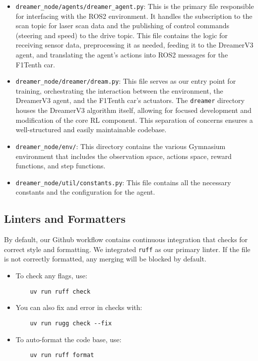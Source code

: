 \begin{itemize}
    \item \texttt{dreamer\_node/agents/dreamer\_agent.py}: This is the primary file responsible for interfacing with the ROS2 environment.  It handles the subscription to the scan topic for laser scan data and the publishing of control commands (steering and speed) to the drive topic.  This file contains the logic for receiving sensor data, preprocessing it as needed, feeding it to the DreamerV3 agent, and translating the agent's actions into ROS2 messages for the F1Tenth car.
    \item \texttt{dreamer\_node/dreamer/dream.py}: This file serves as our entry point for training, orchestrating the interaction between the environment, the DreamerV3 agent, and the F1Tenth car's actuators.  The \texttt{dreamer} directory houses the DreamerV3 algorithm itself, allowing for focused development and modification of the core RL component.  This separation of concerns ensures a well-structured and easily maintainable codebase.
    \item \texttt{dreamer\_node/env/}: This directory contains the various Gymnasium environment that includes the observation space, actions space, reward functions, and step functions.
    \item \texttt{dreamer\_node/util/constants.py}: This file contains all the necessary constants and the configuration for the agent.
    
\end{itemize}

\subsection{Linters and Formatters}
By default, our Github workflow contains continuous integration that checks for correct style and formatting. We integrated \texttt{ruff} as our primary linter. If the file is not correctly formatted, any merging will be blocked by default.

\begin{itemize}
    \item To check any flags, use:
    \begin{verbatim}
    uv run ruff check
    \end{verbatim}
    \item You can also fix and error in checks with:
    \begin{verbatim}
    uv run rugg check --fix
    \end{verbatim}
    \item To auto-format the code base, use:
    \begin{verbatim}
    uv run ruff format
    \end{verbatim}
\end{itemize}


